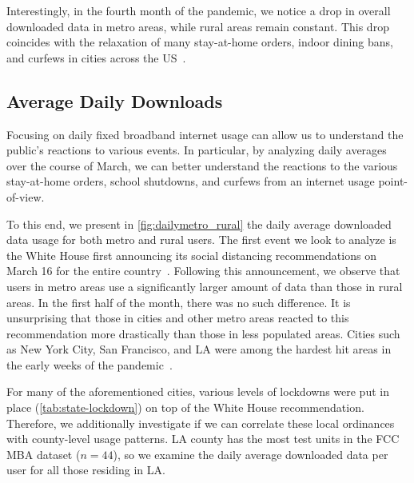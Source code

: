 Interestingly, in the fourth month of the pandemic, we notice a drop in overall downloaded data in metro areas, while rural areas remain constant. This drop coincides with the relaxation of many stay-at-home orders, indoor dining bans, and curfews in cities across the \gls{US}~\cite{money2020la,gov2020nyc}.


\subsection{Average Daily Downloads}
Focusing on daily fixed broadband internet usage can allow us to understand the public's reactions to various events. In particular, by analyzing daily averages over the course of March, we can better understand the reactions to the various stay-at-home orders, school shutdowns, and curfews from an internet usage point-of-view.

To this end, we present in \cref{fig:dailymetro_rural} the daily average downloaded data usage for both metro and rural users. The first event we look to analyze is the White House first announcing its social distancing recommendations on March 16 for the entire country~\cite{trump2020coronavirus}. Following this announcement, we observe that users in metro areas use a significantly larger amount of data than those in rural areas. In the first half of the month, there was no such difference. It is unsurprising that those in cities and other metro areas reacted to this recommendation more drastically than those in less populated areas. Cities such as New York City, San Francisco, and \gls{LA} were among the hardest hit areas in the early weeks of the pandemic~\cite{cdc2020tracker}.

For many of the aforementioned cities, various levels of lockdowns were put in place (\cref{tab:state-lockdown}) on top of the White House recommendation. Therefore, we additionally investigate if we can correlate these local ordinances with county-level usage patterns. \gls{LA} county has the most test units in the \gls{FCC} \gls{MBA} dataset ($n=44$), so we examine the daily average downloaded data per user for all those residing in \gls{LA}.

